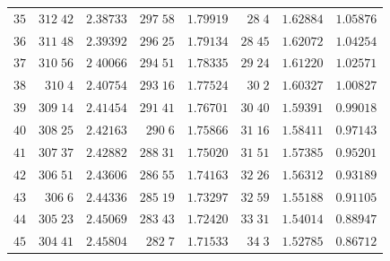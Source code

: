\begin{center}
\begin{tabular}{r|r|r|r|r|r|r|r}
$35$&$312\;42$&$2.38733$&$297\;58$&$1.79919$&$28\;4$&$1.62884$&$1.05876$\\
$36$&$311\;48$&$2.39392$&$296\;25$&$1.79134$&$28\;45$&$1.62072$&$1.04254$\\
$37$&$310\;56$&$2\;40066$&$294\;51$&$1.78335$&$29\;24$&$1.61220$&$1.02571$\\
$38$&$310\;4$&$2.40754$&$293\;16$&$1.77524$&$30\;2$&$1.60327$&$1.00827$\\
$39$&$309\;14$&$2.41454$&$291\;41$&$1.76701$&$30\;40$&$1.59391$&$0.99018$\\[2pt]
$40$&$308\;25$&$2.42163$&$290\;6$&$1.75866$&$31\;16$&$1.58411$&$0.97143$\\
$41$&$307\;37$&$2.42882$&$288\;31$&$1.75020$&$31\;51$&$1.57385$&$0.95201$\\
$42$&$306\;51$&$2.43606$&$286\;55$&$1.74163$&$32\;26$&$1.56312$&$0.93189$\\
$43$&$306\;6$&$2.44336$&$285\;19$&$1.73297$&$32\;59$&$1.55188$&$0.91105$\\
$44$&$305\;23$&$2.45069$&$283\;43$&$1.72420$&$33\;31$&$1.54014$&$0.88947$\\[2pt]
$45$&$304\;41$&$2.45804$&$282\;7$&$1.71533$&$34\;3$&$1.52785$&$0.86712$\\
\hline
\end{tabular}
\end{center}
\endgroup
\clearpage
{}
\begingroup
\fontsize{9}{10.2}\selectfont
\setlength{\tabcolsep}{1.5pt}
\renewcommand{\arraystretch}{1.02}
